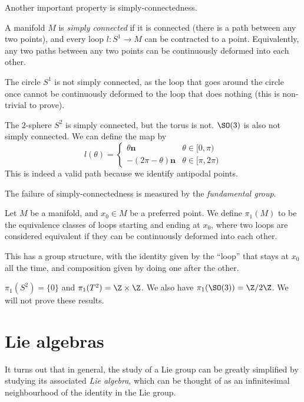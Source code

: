 \documentclass[a4paper]{article}
\begin{document}
Another important property is simply-connectedness.
\begin{defi}
  A manifold $M$ is \emph{simply connected} if it is connected (there is a path between any two points), and every loop $l: S^1 \to M$ can be contracted to a point. Equivalently, any two paths between any two points can be continuously deformed into each other.
\end{defi}

\begin{eg}
  The circle $S^1$ is not simply connected, as the loop that goes around the circle once cannot be continuously deformed to the loop that does nothing (this is non-trivial to prove).
\end{eg}

\begin{eg}
  The $2$-sphere $S^2$ is simply connected, but the torus is not. $\SO(3)$ is also not simply connected. We can define the map by
  \[
    l(\theta) =
    \begin{cases}
      \theta \mathbf{n} & \theta \in [0, \pi)\\
      -(2\pi - \theta) \mathbf{n} & \theta \in [\pi, 2\pi)
    \end{cases}
  \]
  This is indeed a valid path because we identify antipodal points.
\end{eg}

The failure of simply-connectedness is measured by the \emph{fundamental group}.
\begin{defi}
  Let $M$ be a manifold, and $x_0 \in M$ be a preferred point. We define $\pi_1(M)$ to be the equivalence classes of loops starting and ending at $x_0$, where two loops are considered equivalent if they can be continuously deformed into each other.

  This has a group structure, with the identity given by the ``loop'' that stays at $x_0$ all the time, and composition given by doing one after the other.
\end{defi}

\begin{eg}
  $\pi_1(S^2) = \{0\}$ and $\pi_1(T^2) = \Z \times \Z$. We also have $\pi_1(\SO(3)) = \Z/2\Z$. We will not prove these results.
\end{eg}


\section{Lie algebras}
It turns out that in general, the study of a Lie group can be greatly simplified by studying its associated \emph{Lie algebra}, which can be thought of as an infinitesimal neighbourhood of the identity in the Lie group.
\end{document}
